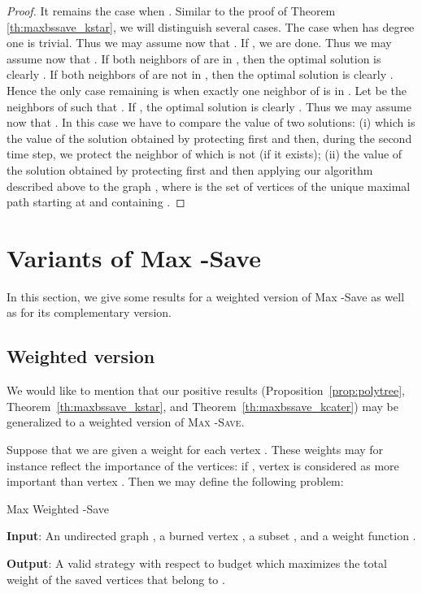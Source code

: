 \documentclass[10pt]{article}
\newcommand{\probtitle}[1]{\textsc{#1}}
\newcommand{\qedfill}[0]{ }
\begin{document}
\begin{proof}
It remains the case when . Similar to the proof of Theorem \ref{th:maxbssave_kstar}, we will distinguish several cases. The case when  has degree one is trivial. Thus we may assume now that . If , we are done. Thus we may assume now that . If both neighbors of  are in , then the optimal solution is clearly . If both neighbors of  are not in , then the optimal solution is clearly . Hence the only case remaining is when exactly one neighbor of  is in . Let  be the neighbors of  such that . If , the optimal solution is clearly . Thus we may assume now that . In this case we have to compare the value of two solutions: (i)  which is the value of the solution obtained by protecting first  and then, during the second time step, we protect the neighbor of  which is not  (if it exists); (ii) the value of the solution obtained by protecting first  and then applying our algorithm described above to the graph , where  is the set of vertices of the unique maximal path starting at  and containing .
\qedfill
\end{proof}


\section{Variants of {\sc Max -Save}} \label{s:variants}

In this section, we give some results for a weighted version of {\sc Max -Save} as well as for its complementary version. 

\subsection{Weighted version}

We would like to mention that our positive results (Proposition~\ref{prop:polytree}, Theorem~\ref{th:maxbssave_kstar}, and Theorem~\ref{th:maxbssave_kcater}) may be generalized to a weighted version of \probtitle{Max -Save}.

Suppose that we are given a weight  for each vertex . These weights may for instance reflect the importance of the vertices: if , vertex  is considered as more important than vertex .
Then we may define the following problem:

\medskip

\noindent 
{\sc Max Weighted -Save}

\noindent\textbf{Input}: An undirected graph , a burned vertex , a subset , and a weight function .

\noindent\textbf{Output}: A valid strategy   with respect to budget  which maximizes the total weight of the saved vertices that belong to .\\
\end{document}
